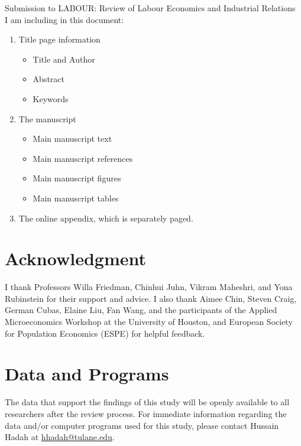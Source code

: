 \documentclass[12pt,english]{article}
\begin{document}
\thispagestyle{empty}
\begingroup
  \doublespacing
  \centering
  \LARGE Submission to LABOUR: Review of Labour Economics and Industrial Relations \\[0.25em]
\endgroup
I am including in this document:
\begin{enumerate}
    \item Title page information
    \begin{itemize}
        \item Title and Author
        \item Abstract
        \item Keywords
    \end{itemize}
    \item The manuscript
    \begin{itemize}
        \item Main manuscript text
        \item Main manuscript references
        \item Main manuscript figures
        \item Main manuscript tables
    \end{itemize}    
    \item The online appendix, which is separately paged.
\end{enumerate}

\section*{Acknowledgment}
I thank Professors Willa Friedman, Chinhui Juhn, Vikram Maheshri, and Yona Rubinstein for their support and advice. I also thank Aimee Chin, Steven Craig, German Cubas, Elaine Liu, Fan Wang, and the participants of the Applied Microeconomics Workshop at the University of Houston, and European Society for Population Economics (ESPE) for helpful feedback.

\section*{Data and Programs}

The data that support the findings of this study will be openly available to all researchers after the review process. For immediate information regarding the data and/or computer programs used for this study, please contact Hussain Hadah at \href{mailto:hhadah@tulane.edu}{hhadah@tulane.edu}.

\clearpage
\end{document}
